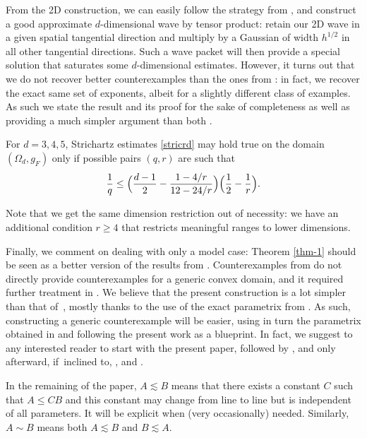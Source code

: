 From the 2D construction, we can easily follow the strategy from \cite{doi2}, and construct a good approximate $d$-dimensional wave by tensor product: retain our 2D wave in a given spatial tangential direction and multiply by a Gaussian of width $h^{1/2}$ in all other tangential directions. Such a wave packet will then provide a special solution that saturates some $d$-dimensional estimates. However, it turns out that we do not recover better counterexamples than the ones from \cite{doi2}: in fact, we recover the exact same set of exponents, albeit for a slightly different class of examples. As such we state the result and its proof for the sake of completeness as well as providing a much simpler argument than both \cite{doi,doi2}.
\begin{thm}
\label{thm-2}
For $d=3,4,5$, Strichartz estimates \eqref{stricrd} may hold true on the domain $(\Omega_{d},g_{F})$ only if possible pairs $(q,r)$ are
such that
\begin{equation*}\label{adm-1/10d}
\frac 1q\leq \Bigl(\frac{d-1} 2 -\frac {1-4/r}{12-24/r}\Bigr)\Bigl(\frac{1}{2}-\frac{1}{r}\Bigr).
\end{equation*}
\end{thm}
Note that we get the same dimension restriction out of necessity: we have an additional condition $r\geq 4$ that restricts meaningful ranges to lower dimensions.

Finally, we comment on dealing with only a model case: Theorem \ref{thm-1} should be seen as a better version of the results from \cite{doi}. Counterexamples from \cite{doi} do not directly provide counterexamples for a generic convex domain, and it required further treatment in \cite{doi2}. We believe that the present construction is a lot simpler than that of~\cite{doi}, mostly thanks to the use of the exact parametrix from \cite{ILP3}. As such, constructing a generic counterexample will be easier, using in turn the parametrix obtained in \cite{ILLP} and following the present work as a blueprint. In fact, we suggest to any interested reader to start with the present paper, followed by \cite{ILP3}, \cite{ILLP} and only afterward, if~inclined to, \cite{doi}, \cite{doi2} and \cite{Annals}.

In the remaining of the paper, $A\lesssim B$ means that there exists a constant $C$ such that $A\leq CB$ and this constant may change from line to line but is independent of all parameters. It will be explicit when (very occasionally) needed. Similarly, $A\sim B$ means both $A\lesssim B$ and $B\lesssim A$.


